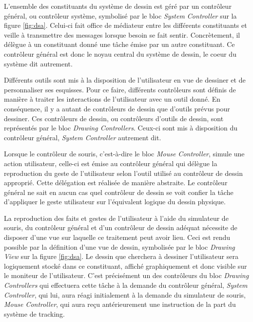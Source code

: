 \documentclass[11pt,a4paper,oldfontcommands]{memoir}
\begin{document}
L'ensemble des constituants du système de dessin est géré par un contrôleur général, ou contrôleur système, symbolisé par le bloc \textit{System Controller} sur la figure \ref{fig:dsa}. Celui-ci fait office de médiateur entre les différents constituants et veille à transmettre des messages lorsque besoin se fait sentir. Concrètement, il délègue à un constituant donné une tâche émise par un autre constituant. Ce contrôleur général est donc le noyau central du système de dessin, le coeur du système dit autrement.

Différents outils sont mis à la disposition de l'utilisateur en vue de dessiner et de personnaliser ses esquisses. Pour ce faire, différents contrôleurs sont définis de manière à traiter les interactions de l'utilisateur avec un outil donné. En conséquence, il y a autant de contrôleurs de dessin que d'outils prévus pour dessiner. Ces contrôleurs de dessin, ou contrôleurs d'outils de dessin, sont représentés par le bloc \textit{Drawing Controllers}. Ceux-ci sont mis à disposition du contrôleur général, \textit{System Controller} autrement dit.

Lorsque le contrôleur de souris, c'est-à-dire le bloc \textit{Mouse Controller}, simule une action utilisateur, celle-ci est émise au contrôleur général qui délègue la reproduction du geste de l'utilisateur selon l'outil utilisé au contrôleur de dessin approprié. Cette délégation est réalisée de manière abstraite. Le contrôleur général ne sait en aucun cas quel contrôleur de dessin se voit confier la tâche d'appliquer le geste utilisateur sur l'équivalent logique du dessin physique.

La reproduction des faits et gestes de l'utilisateur à l'aide du simulateur de souris, du contrôleur général et d'un contrôleur de dessin adéquat nécessite de disposer d'une vue sur laquelle ce traitement peut avoir lieu. Ceci est rendu possible par la définition d'une vue de dessin, symbolisée par le bloc \textit{Drawing View} sur la figure \ref{fig:dsa}. Le dessin que cherchera à dessiner l'utilisateur sera logiquement stocké dans ce constituant, affiché graphiquement et donc visible sur le moniteur de l'utilisateur. C'est précisément un des contrôleurs du bloc \textit{Drawing Controllers} qui effectuera cette tâche à la demande du contrôleur général, \textit{System Controller}, qui lui, aura réagi initialement à la demande du simulateur de souris, \textit{Mouse Controller}, qui aura reçu antérieurement une instruction de la part du système de tracking.
\end{document}
